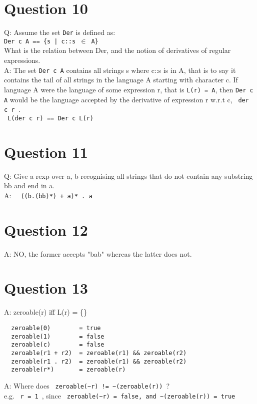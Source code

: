 \documentclass[english]{scrartcl}
\begin{document}
\section*{Question 10}
Q: Assume the set \verb|Der| is defined as: \\
\verb~Der c A == {s | c::s ~$\in$\verb~ A}~ \\
What is the relation between Der, and the notion of derivatives of regular expressions. \\
A: The set \verb~Der c A~ contains all strings s where c::s is in A, that is to say it contains the tail of all strings in the language A starting with character c.
If language A were the language of some expression r, that is \verb~L(r) = A~, then \verb~Der c A~ would be the language accepted by the derivative
of expression r w.r.t c, \verb~ der c r ~. \\
\verb~ L(der c r) == Der c L(r) ~

\section*{Question 11}
Q: Give a rexp over {a, b} recognising all strings that do not contain any substring bb and end in a. \\
A: \verb~  ((b.(bb)*) + a)* . a ~

\section*{Question 12}
A: NO, the former accepts "bab" whereas the latter does not.

\section*{Question 13}
A:
zeroable(r) iff L(r) = \{\}

\begin{verbatim}
  zeroable(0)        = true
  zeroable(1)        = false
  zeroable(c)        = false
  zeroable(r1 + r2)  = zeroable(r1) && zeroable(r2)
  zeroable(r1 . r2)  = zeroable(r1) && zeroable(r2)
  zeroable(r*)       = zeroable(r)
\end{verbatim}


A: Where does \verb| zeroable(~r) != ~(zeroable(r)) |? \\
e.g. \verb| r = 1 |, since \verb| zeroable(~r) = false, and ~(zeroable(r)) = true|
\end{document}
